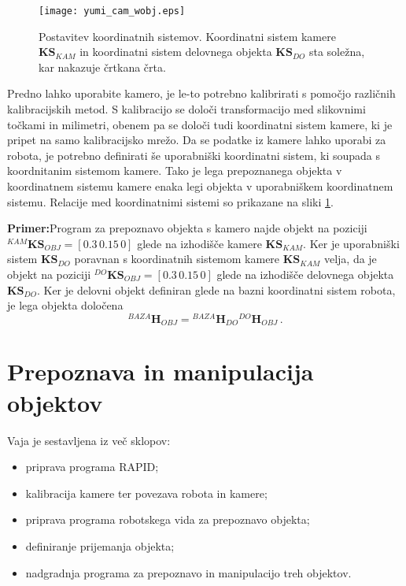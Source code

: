 \begin{figure}[!hbt]
\centering
\texttt{[image: yumi\_cam\_wobj.eps]}
\caption{Postavitev koordinatnih sistemov. Koordinatni sistem kamere $\textbf{KS}_{KAM}$ in koordinatni sistem delovnega objekta $\textbf{KS}_{DO}$ sta soležna, kar nakazuje črtkana črta.}
\label{fig:yumi_kam_wobj}
\end{figure}


Predno lahko uporabite kamero, je le-to potrebno kalibrirati s pomočjo različnih kalibracijskih metod. S kalibracijo se določi transformacijo med slikovnimi točkami in milimetri, obenem pa se določi tudi koordinatni sistem kamere, ki je pripet na samo kalibracijsko mrežo. Da se podatke iz kamere lahko uporabi za robota, je potrebno definirati še uporabniški koordinatni sistem, ki soupada s koordnitanim sistemom kamere. Tako je lega prepoznanega objekta v koordinatnem sistemu kamere enaka legi objekta v uporabniškem koordinatnem sistemu. Relacije med koordinatnimi sistemi so prikazane na sliki \ref{fig:yumi_kam_wobj}.


\newpage
\begin{mdframed}[backgroundcolor=blue!20, shadow=true,roundcorner=8pt]
\textbf{Primer:}Program za prepoznavo objekta s kamero najde objekt na poziciji ${}^{KAM}\textbf{KS}_{OBJ} = [0.3\, 0.15\, 0]$ glede na izhodišče kamere $\textbf{KS}_{KAM}$. Ker je uporabniški sistem $\textbf{KS}_{DO}$ poravnan s koordinatnih sistemom kamere $\textbf{KS}_{KAM}$ velja, da je objekt na poziciji ${}^{DO}\textbf{KS}_{OBJ} = [0.3\, 0.15\, 0]$ glede na izhodišče delovnega objekta $\textbf{KS}_{DO}$. Ker je delovni objekt definiran glede na bazni koordinatni sistem robota, je lega objekta določena
\begin{equation*}
{}^{BAZA}\textbf{H}_{OBJ} = {}^{BAZA}\textbf{H}_{DO}  {}^{DO}\textbf{H}_{OBJ} \,.
\end{equation*}
\end{mdframed}


\section{Prepoznava in manipulacija objektov}

Vaja je sestavljena iz več sklopov:
\begin{itemize}
  \item priprava programa RAPID;
  \item kalibracija kamere ter povezava robota in kamere;
  \item priprava programa robotskega vida za prepoznavo objekta;
  \item definiranje prijemanja objekta;
  \item nadgradnja programa za prepoznavo in manipulacijo treh objektov.
\end{itemize}


